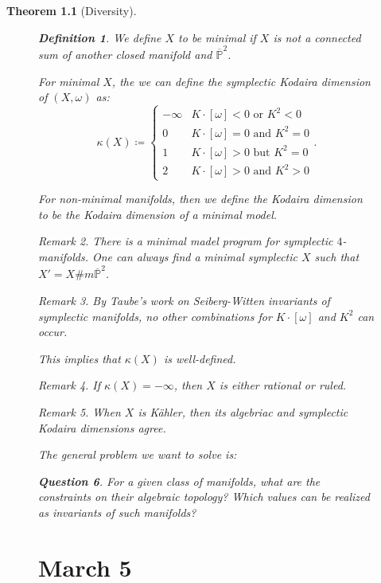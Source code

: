 \documentclass[leqno, openany]{memoir}
\newtheorem{thm}{Theorem}[chapter]
\newtheorem{quest}[thm]{Question}
\theoremstyle{definition}
\newtheorem{defn}[thm]{Definition}
\theoremstyle{remark}
\newtheorem{rmk}[thm]{Remark}
\theoremstyle{plain}
\theoremstyle{definition}
\theoremstyle{remark}
\renewcommand{\P}{\mathbb{P}}
\begin{document}
\begin{thm}[Diversity]
\begin{figure}[H]
\begin{defn} We define $X$ to be minimal if $X$ is not a connected sum of
another closed manifold and $\overline{\P}^2$.  \end{defn}

For minimal $X$, the we can define the \textit{symplectic Kodaira dimension} of
$(X, \omega)$ as: \[ \kappa(X) \coloneqq \begin{cases} - \infty & K \cdot
    [\omega] < 0 \text{ or } K^2 < 0 \\ 0 & K \cdot [\omega] = 0 \text{ and }
    K^2 = 0 \\ 1 & K \cdot [\omega] > 0 \text{ but } K^2 = 0 \\ 2 & K \cdot
[\omega] > 0 \text{ and } K^2 > 0 \end{cases}. \]

For non-minimal manifolds, then we define the Kodaira dimension to be the
Kodaira dimension of a minimal model.

\begin{rmk} There is a \textit{minimal madel program} for symplectic
$4$-manifolds. One can always find a minimal symplectic $X$ such that $X' = X
\# m \overline{\P}^2$.  \end{rmk}

\begin{rmk} By Taube's work on Seiberg-Witten invariants of symplectic
manifolds, no other combinations for $K \cdot [\omega]$ and $K^2$ can occur.
\end{rmk}

This implies that $\kappa(X)$ is well-defined.

\begin{rmk} If $\kappa(X) = -\infty$, then $X$ is either rational or ruled.
\end{rmk}

\begin{rmk} When $X$ is K\"ahler, then its algebriac and symplectic Kodaira
dimensions agree.  \end{rmk}

The general problem we want to solve is: \begin{quest} For a given class of
manifolds, what are the constraints on their algebraic topology? Which values
can be realized as invariants of such manifolds?  \end{quest}


\chapter{March 5}%


\end{figure}
\end{thm}
\end{document}
